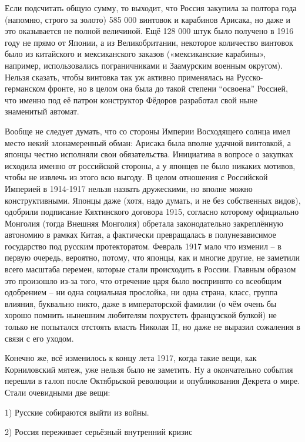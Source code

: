 Если подсчитать общую сумму, то выходит, что Россия закупила за полтора года (напомню, строго за золото) 585 000 винтовок и карабинов Арисака, но даже и это оказывается не полной величиной. Ещё 128 000 штук было получено в 1916 году не прямо от Японии, а из Великобритании, некоторое количество винтовок было из китайского и мексиканского заказов («мексиканские карабины», например, использовались пограничниками и Заамурским военным округом). Нельзя сказать, чтобы винтовка так уж активно применялась на Русско-германском фронте, но в целом она была до такой степени “освоена” Россией, что именно под её патрон конструктор Фёдоров разработал свой ныне знаменитый автомат.

Вообще не следует думать, что со стороны Империи Восходящего солнца имел место некий злонамеренный обман: Арисака была вполне удачной винтовкой, а японцы честно исполняли свои обязательства. Инициатива в вопросе о закупках исходила именно от российской стороны, а у японцев не было никаких мотивов, чтобы не извлечь из этого всю выгоду. В целом отношения с Российской Империей в 1914-1917 нельзя назвать дружескими, но вполне можно конструктивными. Японцы даже (хотя, надо думать, и не без собственных видов), одобрили подписание Кяхтинского договора 1915, согласно которому официально Монголия (тогда Внешняя Монголия) обретала законодательно закреплённую автономию в рамках Китая, а фактически превращалась в полунезависимое государство под русским протекторатом. Февраль 1917 мало что изменил – в первую очередь, вероятно, потому, что японцы, как и многие другие, не заметили всего масштаба перемен, которые стали происходить в России. Главным образом это произошло из-за того, что отречение царя было воспринято со всеобщим одобрением – ни одна социальная прослойка, ни одна страна, класс, группа влияния, буквально никто, даже в императорской фамилии (о чём очень бы хорошо помнить нынешним любителям похрустеть французской булкой) не только не попытался отстоять власть Николая II, но даже не выразил сожаления в связи с его уходом.

Конечно же, всё изменилось к концу лета 1917, когда такие вещи, как Корниловский мятеж, уже нельзя было не заметить. Ну а окончательно события перешли в галоп после Октябрьской революции и опубликования Декрета о мире. Стали очевидными две вещи:

1) Русские собираются выйти из войны.

2) Россия переживает серьёзный внутренний кризис

